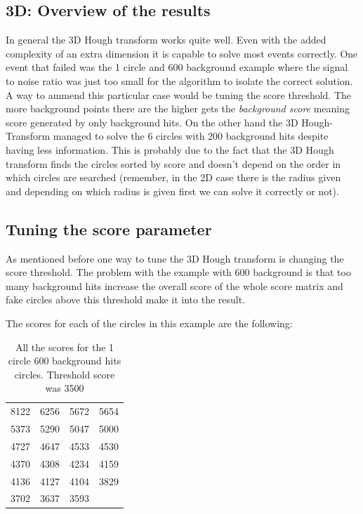 \documentclass[11pt,twoside]{scrreprt}
\begin{document}
\subsection{3D: Overview of the results} %
\label{ssub:3d_overview_of_the_results}

In general the 3D Hough transform works quite well. Even with the added complexity of an extra dimension it is capable to solve most
events correctly. One event that failed was the 1 circle and 600 background example where the signal to noise ratio was just too small
for the algorithm to isolate the correct solution. A way to ammend this particular case would be tuning the score threshold. The more background
points there are the higher gets the \emph{background score} meaning score generated by only background hits. On the other hand the 3D Hough-
Transform managed to solve the 6 circles with 200 background hits despite having less information. This is probably due to the fact that 
the 3D Hough transform finds the circles sorted by score and doesn't depend on the order in which circles are searched (remember, in the 
2D case there is the radius given and depending on which radius is given first we can solve it correctly or not).


\subsection{Tuning the score parameter} %
\label{ssub:tuning_background_score}
As mentioned before one way to tune the 3D Hough transform is changing the score threshold. The problem with the example with 600 background
is that too many background hits increase the overall score of the whole score matrix and fake circles above this threshold make it into 
the result.

The scores for each of the circles in this example are the following:
\begin{table}[ht]
\centering
\caption[Circle scores for 1 circle 600 background hits]{All the scores for the 1 circle 600 background hits circles. Threshold score was 3500}
\begin{tabular}{c|c|c|c}
\toprule
8122 & 6256 & 5672 & 5654 \\
5373 & 5290 & 5047 & 5000 \\
4727 & 4647 & 4533 & 4530 \\
4370 & 4308 & 4234 & 4159 \\
4136 & 4127 & 4104 & 3829  \\
3702 & 3637 & 3593 \\
\bottomrule
\end{tabular}
\end{table}
\end{document}
